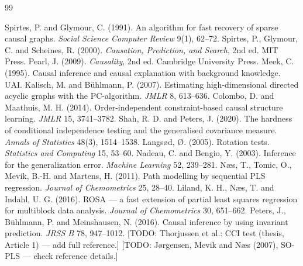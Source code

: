 \documentclass[10pt,leqno]{amsart}
\newcommand{\todo}[1]{{\color{red}[TODO: #1]}}
\begin{document}
\begin{thebibliography}{99}

 Spirtes, P. and Glymour, C. (1991). An algorithm for fast recovery of sparse causal graphs. \emph{Social Science Computer Review} 9(1), 62--72.
 Spirtes, P., Glymour, C. and Scheines, R. (2000). \emph{Causation, Prediction, and Search}, 2nd ed. MIT Press.
 Pearl, J. (2009). \emph{Causality}, 2nd ed. Cambridge University Press.
 Meek, C. (1995). Causal inference and causal explanation with background knowledge. UAI.
 Kalisch, M. and B\"uhlmann, P. (2007). Estimating high-dimensional directed acyclic graphs with the PC-algorithm. \emph{JMLR} 8, 613--636.
 Colombo, D. and Maathuis, M. H. (2014). Order-independent constraint-based causal structure learning. \emph{JMLR} 15, 3741--3782.
 Shah, R. D. and Peters, J. (2020). The hardness of conditional independence testing and the generalised covariance measure. \emph{Annals of Statistics} 48(3), 1514--1538.
 Langs{\o}d, \O. (2005). Rotation tests. \emph{Statistics and Computing} 15, 53--60.
 Nadeau, C. and Bengio, Y. (2003). Inference for the generalization error. \emph{Machine Learning} 52, 239--281.
 N\ae s, T., Tomic, O., Mevik, B.-H. and Martens, H. (2011). Path modelling by sequential PLS regression. \emph{Journal of Chemometrics} 25, 28--40.
 Liland, K. H., N\ae s, T. and Indahl, U. G. (2016). ROSA --- a fast extension of partial least squares regression for multiblock data analysis. \emph{Journal of Chemometrics} 30, 651--662.
 Peters, J., B\"uhlmann, P. and Meinshausen, N. (2016). Causal inference by using invariant prediction. \emph{JRSS B} 78, 947--1012.
 \todo{Thorjussen et al.: CCI test (thesis, Article 1) --- add full reference.}
 \todo{J{\o}rgensen, Mevik and N\ae s (2007), SO-PLS --- check reference details.}

\end{thebibliography}
\end{document}

